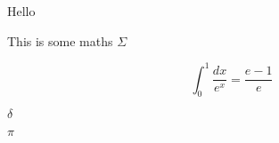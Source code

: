 \documentclass{article}
\begin{document}
Hello

This is some maths $\Sigma$

\[ \int_0^1 \frac{dx}{e^x} = \frac{e-1}{e} \]

$\delta$

$\pi$
\end{document}
